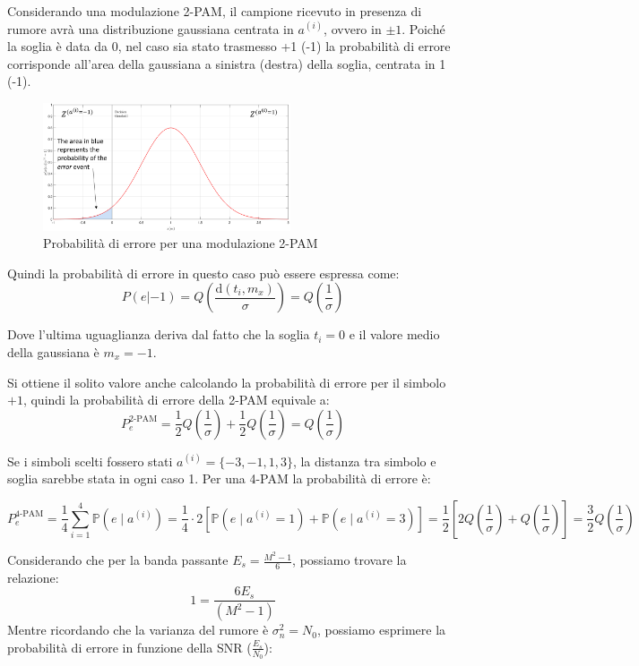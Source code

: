 Considerando una modulazione 2-PAM, il campione ricevuto in presenza di rumore avrà una distribuzione gaussiana centrata in $a^{(i)}$, ovvero in $\pm 1$. Poiché la soglia è data da 0, nel caso sia stato trasmesso +1 (-1) la probabilità di errore corrisponde all'area della gaussiana a sinistra (destra) della soglia, centrata in 1 (-1).

\begin{figure}[ht]
    \centering
    \includegraphics[width=0.65\textwidth]{imgs/2pamerror.jpg}
    \caption*{Probabilità di errore per una modulazione 2-PAM}
\end{figure}


Quindi la probabilità di errore in questo caso può essere espressa come:
\[
    P(e | -1) = Q\left(\frac{\text{d}(t_i, m_x)}{\sigma}\right) = Q\left(\frac{1}{\sigma}\right)
\]

Dove l'ultima uguaglianza deriva dal fatto che la soglia $t_i=0$ e il valore medio della gaussiana è $m_x = -1$.

Si ottiene il solito valore anche calcolando la probabilità di errore per il simbolo $+1$, quindi la probabilità di errore della 2-PAM equivale a:
\[
    P^{\text{2-PAM}}_e = \frac{1}{2} Q\left(\frac{1}{\sigma}\right) + \frac{1}{2} Q\left(\frac{1}{\sigma}\right) = Q\left(\frac{1}{\sigma}\right)
\]

Se i simboli scelti fossero stati $a^{(i)} = \{-3, -1, 1, 3\}$, la distanza tra simbolo e soglia sarebbe stata in ogni caso 1.
Per una 4-PAM la probabilità di errore è:

\[ 
    P^{\text{4-PAM}}_e = \frac{1}{4} \sum_{i=1}^{4} \mathbb{P}(e \mid a^{(i)}) = \frac{1}{4} \cdot 2 \left[ \mathbb{P}(e \mid a^{(i)} = 1) + \mathbb{P}(e \mid a^{(i)} = 3) \right] = \frac{1}{2} \left[ 2 Q\left( \frac{1}{\sigma} \right) + Q\left( \frac{1}{\sigma} \right) \right] = \frac{3}{2} Q\left( \frac{1}{\sigma} \right)
\]

Considerando che per la banda passante $E_s = \frac{M^2 - 1}{6}$, possiamo trovare la relazione:
\[
    1 = \frac{6 E_s}{(M^2 - 1)}
\]
Mentre ricordando che la varianza del rumore è $\sigma_n^2 = N_0$, possiamo esprimere la probabilità di errore in funzione della SNR ($\frac{E_s}{N_0}$):

